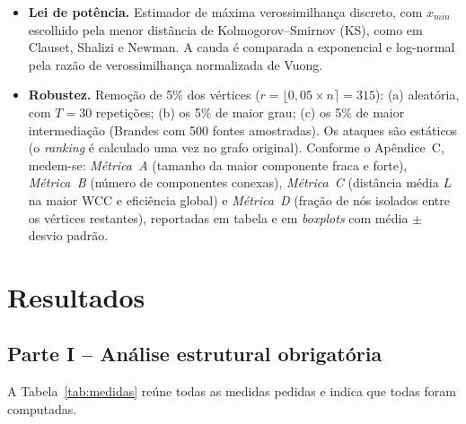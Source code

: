 \documentclass[10pt,a4paper,twocolumn]{article}
\begin{document}
\begin{itemize}
\item \textbf{Lei de potência.} Estimador de máxima verossimilhança discreto, com $x_{min}$ escolhido pela menor distância de Kolmogorov--Smirnov (KS), como em Clauset, Shalizi e Newman. A cauda é comparada a exponencial e log-normal pela razão de verossimilhança normalizada de Vuong.
\item \textbf{Robustez.} Remoção de 5\% dos vértices ($r = \lfloor 0{,}05 \times n \rceil = 315$): (a) aleatória, com $T = 30$ repetições; (b) os 5\% de maior grau; (c) os 5\% de maior intermediação (Brandes com 500 fontes amostradas). Os ataques são estáticos (o \emph{ranking} é calculado uma vez no grafo original). Conforme o Apêndice~C, medem-se: \emph{Métrica~A} (tamanho da maior componente fraca e forte), \emph{Métrica~B} (número de componentes conexas), \emph{Métrica~C} (distância média $L$ na maior WCC e eficiência global) e \emph{Métrica~D} (fração de nós isolados entre os vértices restantes), reportadas em tabela e em \emph{boxplots} com média $\pm$ desvio padrão.
\end{itemize}

\section{Resultados}
\subsection{Parte I -- Análise estrutural obrigatória}
A Tabela~\ref{tab:medidas} reúne todas as medidas pedidas e indica que todas foram computadas.
\end{document}
